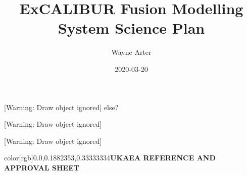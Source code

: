 \documentclass[a4paper]{article}
\title{ExCALIBUR Fusion Modelling System Science Plan}
\author{Wayne Arter}
\date{2020-03-20}
\newcommand\textstyleGuidanceTextChar[1]{\foreignlanguage{english}{\textrm{\text
color[rgb]{0.0,0.1882353,0.33333334}{#1}}}}
\begin{document}
\clearpage\setcounter{page}{1}\pagestyle{Standard}
\thispagestyle{FirstPage}
[Warning: Draw object ignored]%
else?



\bigskip


\bigskip


\bigskip


\bigskip

[Warning: Draw object ignored]

[Warning: Draw object ignored]\ 

\clearpage
\bigskip


\bigskip

{\centering
\textstyleGuidanceTextChar{\textbf{UKAEA REFERENCE AND APPROVAL SHEET}}
\par}
\end{document}
